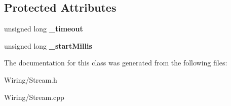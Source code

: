 \subsection*{Protected Attributes}
\begin{DoxyCompactItemize}
\item 
\hypertarget{class_stream_aae48f1a926d2e82a452f2c75af0c6a29}{}unsigned long {\bfseries \+\_\+timeout}\label{class_stream_aae48f1a926d2e82a452f2c75af0c6a29}

\item 
\hypertarget{class_stream_abf61d2006d28d18f2e028285a323fe5a}{}unsigned long {\bfseries \+\_\+start\+Millis}\label{class_stream_abf61d2006d28d18f2e028285a323fe5a}

\end{DoxyCompactItemize}


The documentation for this class was generated from the following files\+:\begin{DoxyCompactItemize}
\item 
Wiring/Stream.\+h\item 
Wiring/Stream.\+cpp\end{DoxyCompactItemize}
